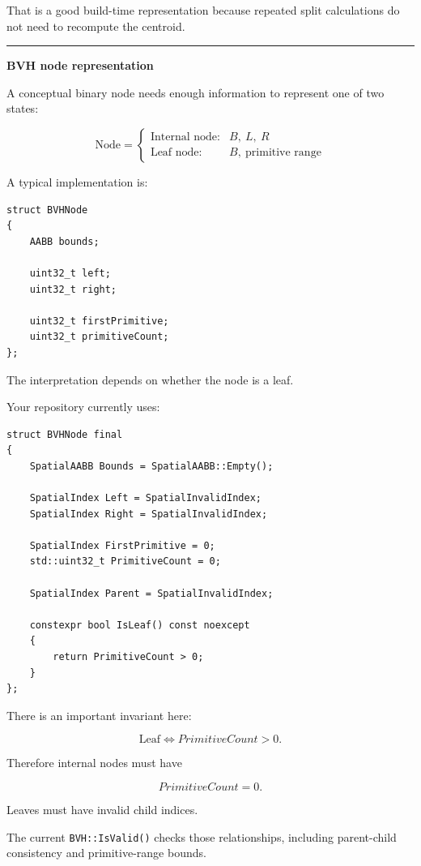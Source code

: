 That is a good build-time representation because repeated split calculations do not need to recompute the centroid.

\begin{center}\rule{0.5\linewidth}{0.5pt}\end{center}

\textbf{BVH node representation}

A conceptual binary node needs enough information to represent one of two states:

\[
\text{Node}
=
\begin{cases}
\text{Internal node}:& B,\ L,\ R\\[2mm]
\text{Leaf node}:& B,\ \text{primitive range}
\end{cases}
\]

A typical implementation is:

\begin{verbatim}
struct BVHNode
{
    AABB bounds;

    uint32_t left;
    uint32_t right;

    uint32_t firstPrimitive;
    uint32_t primitiveCount;
};
\end{verbatim}

The interpretation depends on whether the node is a leaf.

Your repository currently uses:

\begin{verbatim}
struct BVHNode final
{
    SpatialAABB Bounds = SpatialAABB::Empty();

    SpatialIndex Left = SpatialInvalidIndex;
    SpatialIndex Right = SpatialInvalidIndex;

    SpatialIndex FirstPrimitive = 0;
    std::uint32_t PrimitiveCount = 0;

    SpatialIndex Parent = SpatialInvalidIndex;

    constexpr bool IsLeaf() const noexcept
    {
        return PrimitiveCount > 0;
    }
};
\end{verbatim}

There is an important invariant here:

\[
\text{Leaf}\iff PrimitiveCount>0.
\]

Therefore internal nodes must have

\[
PrimitiveCount=0.
\]

Leaves must have invalid child indices.

The current \texttt{BVH::IsValid()} checks those relationships, including parent-child consistency and primitive-range bounds.

